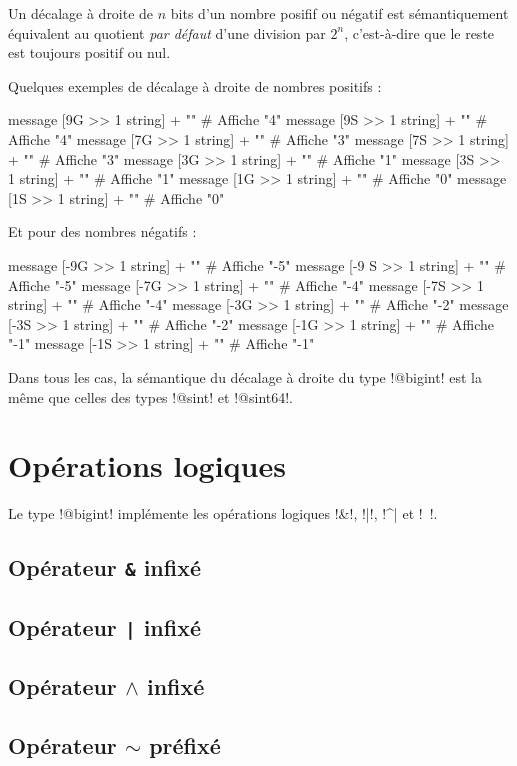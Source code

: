 Un décalage à droite de $n$ bits d'un nombre posifif ou négatif est sémantiquement équivalent au quotient \emph{par défaut} d'une division par $2^n$, c'est-à-dire que le reste est toujours positif ou nul.

Quelques exemples de décalage à droite de nombres positifs :

\begin{galgas}
  message [9G >> 1 string] + "\n" # Affiche "4"
  message [9S >> 1 string] + "\n" # Affiche "4"
  message [7G >> 1 string] + "\n" # Affiche "3"
  message [7S >> 1 string] + "\n" # Affiche "3"
  message [3G >> 1 string] + "\n" # Affiche "1"
  message [3S >> 1 string] + "\n" # Affiche "1"
  message [1G >> 1 string] + "\n" # Affiche "0"
  message [1S >> 1 string] + "\n" # Affiche "0"
\end{galgas}


Et pour des nombres négatifs :

\begin{galgas}
  message [-9G >> 1 string] + "\n" # Affiche "-5"
  message [-9 S >> 1 string] + "\n" # Affiche "-5"
  message [-7G >> 1 string] + "\n" # Affiche "-4"
  message [-7S >> 1 string] + "\n" # Affiche "-4"
  message [-3G >> 1 string] + "\n" # Affiche "-2"
  message [-3S >> 1 string] + "\n" # Affiche "-2"
  message [-1G >> 1 string] + "\n" # Affiche "-1"
  message [-1S >> 1 string] + "\n" # Affiche "-1"
\end{galgas}

Dans tous les cas, la sémantique du décalage à droite du type \ggs!@bigint! est la même que celles des types \ggs!@sint! et \ggs!@sint64!.










\section{Opérations logiques}

Le type \ggs!@bigint! implémente les opérations logiques \ggs!&!, \ggs!|!, \ggs!^| et \ggs!~!.

\subsection{Opérateur \texttt{\&} infixé}


\subsection{Opérateur \texttt{|} infixé}


\subsection{Opérateur $\wedge$ infixé}


\subsection{Opérateur $\sim$ préfixé}


